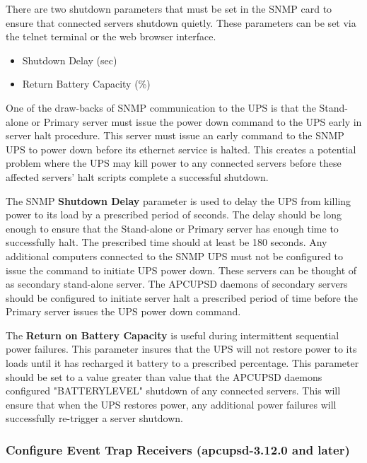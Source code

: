{{{{{{{There are two shutdown parameters that must be set in the SNMP card to ensure that
connected servers shutdown quietly.  These parameters can be set via the telnet terminal
or the web browser interface.

\begin{itemize}
\item Shutdown Delay (sec)
\item Return Battery Capacity (\%)
\end{itemize}

One of the draw-backs of SNMP communication to the UPS is that the Stand-alone or Primary
server must issue the power down command to the UPS early in server halt procedure.
This server must issue an early command to the SNMP UPS to power down before its ethernet
service is halted.  This creates a potential problem where the UPS may kill power to any
connected servers before these affected servers' halt scripts complete a successful shutdown.


The SNMP {\bf Shutdown Delay} parameter is used to delay the UPS from killing power to its load
by a prescribed period of seconds.  The delay should be long enough to ensure that the 
Stand-alone or Primary server has enough time to successfully halt.  The prescribed time should at least
be 180 seconds. Any additional computers connected to the SNMP UPS must not be configured
to issue the command to initiate UPS power down.  These servers can be thought of as secondary
stand-alone server.  The APCUPSD daemons of secondary servers should be configured to initiate server
halt a prescribed period of time before the Primary server issues the UPS power down command.


The {\bf Return on Battery Capacity} is useful during intermittent sequential power failures.
This parameter insures that the UPS will not restore power to its loads until it has
recharged it battery to a prescribed percentage. This parameter should be set to a value
greater than value that the APCUPSD daemons configured "BATTERYLEVEL" shutdown of any
connected servers.  This will ensure that when the UPS restores power, any additional power
failures will successfully re-trigger a server shutdown.



\subsubsection*{Configure Event Trap Receivers (apcupsd-3.12.0 and later)}

}}}}}}}
